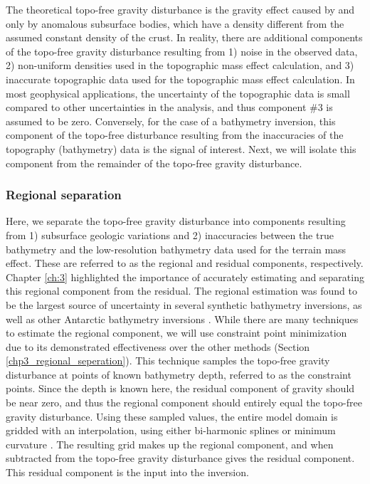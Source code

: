 The theoretical topo-free gravity disturbance is the gravity effect caused by and only by anomalous subsurface bodies, which have a density different from the assumed constant density of the crust. In reality, there are additional components of the topo-free gravity disturbance resulting from 1) noise in the observed data, 2) non-uniform densities used in the topographic mass effect calculation, and 3) inaccurate topographic data used for the topographic mass effect calculation. In most geophysical applications, the uncertainty of the topographic data is small compared to other uncertainties in the analysis, and thus component \#3 is assumed to be zero. Conversely, for the case of a bathymetry inversion, this component of the topo-free disturbance resulting from the inaccuracies of the topography (bathymetry) data is the signal of interest. Next, we will isolate this component from the remainder of the topo-free gravity disturbance.\\

\subsubsection{Regional separation} \label{chp4_regional_separation_method}

Here, we separate the topo-free gravity disturbance into components resulting from 1) subsurface geologic variations and 2) inaccuracies between the true bathymetry and the low-resolution bathymetry data used for the terrain mass effect. These are referred to as the regional and residual components, respectively. Chapter \ref{ch:3} highlighted the importance of accurately estimating and separating this regional component from the residual. The regional estimation was found to be the largest source of uncertainty in several synthetic bathymetry inversions, as well as other Antarctic bathymetry inversions \citep{brisbourneseabed2014}. While there are many techniques to estimate the regional component, we will use constraint point minimization due to its demonstrated effectiveness over the other methods (Section \ref{chp3_regional_seperation}). This technique samples the topo-free gravity disturbance at points of known bathymetry depth, referred to as the constraint points. Since the depth is known here, the residual component of gravity should be near zero, and thus the regional component should entirely equal the topo-free gravity disturbance. Using these sampled values, the entire model domain is gridded with an interpolation, using either bi-harmonic splines \citep{uiedaverde2018} or minimum curvature \citep{smithgridding1990}. The resulting grid makes up the regional component, and when subtracted from the topo-free gravity disturbance gives the residual component. This residual component is the input into the inversion.\\ 

